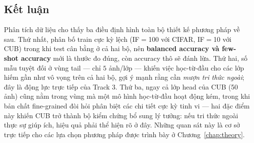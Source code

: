 \subsection{Kết luận}

Phân tích dữ liệu cho thấy ba điều định hình toàn bộ thiết kế phương pháp về sau. Thứ nhất, phân
bố train cực kỳ lệch (IF$=$100 với CIFAR, IF$=$10 với CUB) trong khi test cân bằng ở cả hai bộ,
nên \textbf{balanced accuracy và few-shot accuracy} mới là thước đo đúng, còn accuracy thô sẽ đánh
lừa. Thứ hai, số mẫu tuyệt đối ở vùng tail --- chỉ $5$ ảnh/lớp --- khiến việc học-từ-đầu cho các
lớp hiếm gần như vô vọng trên cả hai bộ, gợi ý mạnh rằng cần \emph{mượn tri thức ngoài}; đây là
động lực trực tiếp của Track 3. Thứ ba, ngay cả lớp head của CUB (50 ảnh) cũng nằm trong vùng mà
một mô hình học-từ-đầu hoạt động kém, trong khi bản chất fine-grained đòi hỏi phân biệt các chi
tiết cực kỳ tinh vi --- hai đặc điểm này khiến CUB trở thành bộ kiểm chứng bổ sung lý tưởng: nếu
tri thức ngoài thực sự giúp ích, hiệu quả phải thể hiện rõ ở đây. Những quan sát này là cơ sở trực
tiếp cho các lựa chọn phương pháp được trình bày ở Chương~\ref{chap:theory}.
